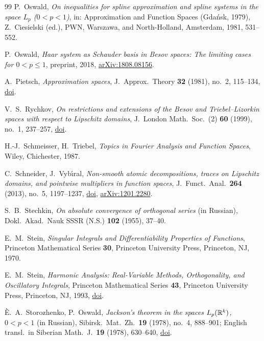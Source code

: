 \begin{thebibliography}{99}
P.~Oswald,
\emph{On inequalities for spline approximation and spline systems in the space $L_p$
($0 < p < 1$)},
in: Approximation and Function Spaces (Gda\'nsk, 1979), Z.~Ciesielski (ed.), PWN, Warszawa, and
North-Holland, Amsterdam, 1981, 531--552.

P.~Oswald,
\emph{Haar system as Schauder basis in Besov spaces: The limiting cases for $0 < p \leq 1$},
preprint, 2018,
\href{https://arxiv.org/abs/1808.08156}{arXiv:1808.08156}.

A.~Pietsch,
\emph{Approximation spaces},
J.\ Approx.\ Theory \textbf{32} (1981), no.~2, 115--134,
\href{https://doi.org/10.1016/0021-9045(81)90109-X}{doi}.

V.~S.~Rychkov,
\emph{On restrictions and extensions of the Besov and Triebel--Lizorkin spaces with respect to
Lipschitz domains},
J.\ London Math.\ Soc.\ (2) \textbf{60} (1999), no.~1, 237--257,
\href{https://doi.org/10.1112/S0024610799007723}{doi}.

H.-J.~Schmeisser, H.~Triebel,
\emph{Topics in Fourier Analysis and Function Spaces},
Wiley, Chichester, 1987.

C.~Schneider, J.~Vyb\'{\i}ral,
\emph{Non-smooth atomic decompositions, traces on Lipschitz domains, and pointwise multipliers
in function spaces}, J.\ Funct.\ Anal.\ \textbf{264} (2013), no.~5, 1197--1237,
\href{https://doi.org/10.1016/j.jfa.2012.12.005}{doi},
\href{https://arxiv.org/abs/1201.2280}{arXiv:1201.2280}.

S.~B.~Stechkin,
\emph{On absolute convergence of orthogonal series} (in Russian),
Dokl.\ Akad.\ Nauk SSSR (N.S.) \textbf{102} (1955), 37--40.

E.~M.~Stein,
\emph{Singular Integrals and Differentiability Properties of Functions},
Princeton Mathematical Series \textbf{30}, Princeton University Press, Princeton, NJ, 1970.

E.~M.~Stein,
\emph{Harmonic Analysis: Real-Variable Methods, Orthogonality, and Oscillatory Integrals},
Princeton Mathematical Series \textbf{43}, Princeton University Press, Princeton, NJ, 1993,
\href{https://doi.org/10.1515/9781400883929}{doi}.

\`E.~A.~Storozhenko, P.~Oswald,
\emph{Jackson's theorem in the spaces $L_p(\mathbb{R}^k)$, $0 < p < 1$} (in Russian),
Sibirsk.\ Mat.\ Zh.\ \textbf{19} (1978), no.~4, 888--901; English transl.\ in Siberian Math.\
J.\ \textbf{19} (1978), 630--640,
\href{https://doi.org/10.1007/BF00967736}{doi}.


\end{thebibliography}

